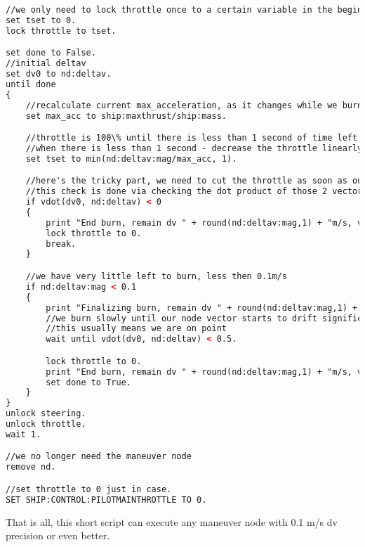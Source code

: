 \begin{lstlisting}[frame=single,language=XML]
//we only need to lock throttle once to a certain variable in the beginning of the loop, and adjust only the variable itself inside it
set tset to 0.
lock throttle to tset.

set done to False.
//initial deltav
set dv0 to nd:deltav.
until done
{
    //recalculate current max_acceleration, as it changes while we burn through fuel
    set max_acc to ship:maxthrust/ship:mass.

    //throttle is 100\% until there is less than 1 second of time left to burn
    //when there is less than 1 second - decrease the throttle linearly
    set tset to min(nd:deltav:mag/max_acc, 1).

    //here's the tricky part, we need to cut the throttle as soon as our nd:deltav and initial deltav start facing opposite directions
    //this check is done via checking the dot product of those 2 vectors
    if vdot(dv0, nd:deltav) < 0
    {
        print "End burn, remain dv " + round(nd:deltav:mag,1) + "m/s, vdot: " + round(vdot(dv0, nd:deltav),1).
        lock throttle to 0.
        break.
    }

    //we have very little left to burn, less then 0.1m/s
    if nd:deltav:mag < 0.1
    {
        print "Finalizing burn, remain dv " + round(nd:deltav:mag,1) + "m/s, vdot: " + round(vdot(dv0, nd:deltav),1).
        //we burn slowly until our node vector starts to drift significantly from initial vector
        //this usually means we are on point
        wait until vdot(dv0, nd:deltav) < 0.5.

        lock throttle to 0.
        print "End burn, remain dv " + round(nd:deltav:mag,1) + "m/s, vdot: " + round(vdot(dv0, nd:deltav),1).
        set done to True.
    }
}
unlock steering.
unlock throttle.
wait 1.

//we no longer need the maneuver node
remove nd.

//set throttle to 0 just in case.
SET SHIP:CONTROL:PILOTMAINTHROTTLE TO 0.
\end{lstlisting} 

That is all, this short script can execute any maneuver node with 0.1 m/s dv precision or even better.
